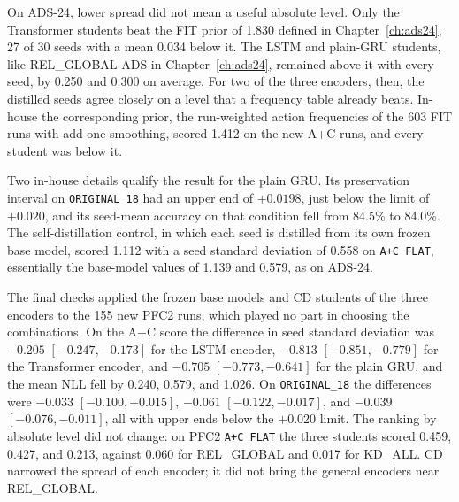 On ADS-24, lower spread did not mean a useful absolute level. Only the
Transformer students beat the FIT prior of 1.830 defined in
Chapter~\ref{ch:ads24}, 27 of 30 seeds with a mean 0.034 below it. The
LSTM and plain-GRU students, like REL\_GLOBAL-ADS in
Chapter~\ref{ch:ads24}, remained above it with every seed, by 0.250 and
0.300 on average. For two of the three encoders, then, the distilled seeds agree
closely on a level that a frequency table already beats. In-house the
corresponding prior, the run-weighted action frequencies of the 603 FIT
runs with add-one smoothing, scored 1.412 on the new A+C runs, and
every student was below it.

Two in-house details qualify the result for the plain GRU. Its
preservation interval on \texttt{ORIGINAL\_18} had an upper end of
$+0.0198$, just below the limit of $+0.020$, and its seed-mean accuracy
on that condition fell from 84.5\% to 84.0\%. The self-distillation control, in which each seed is distilled from
its own frozen base model, scored 1.112 with a seed standard deviation
of 0.558 on \texttt{A+C FLAT}, essentially the base-model values of
1.139 and 0.579, as on ADS-24.

The final checks applied the frozen base models and CD students of the
three encoders to the 155 new PFC2 runs, which played no part in
choosing the combinations. On the A+C score the
difference in seed standard deviation was $-0.205$ $[-0.247, -0.173]$
for the LSTM encoder, $-0.813$ $[-0.851, -0.779]$ for the Transformer
encoder, and $-0.705$ $[-0.773, -0.641]$ for the plain GRU, and the
mean NLL fell by 0.240, 0.579, and 1.026. On \texttt{ORIGINAL\_18} the
differences were $-0.033$ $[-0.100, +0.015]$, $-0.061$
$[-0.122, -0.017]$, and $-0.039$ $[-0.076, -0.011]$, all with upper
ends below the $+0.020$ limit. The ranking by absolute level did not
change: on PFC2 \texttt{A+C FLAT} the three students scored 0.459,
0.427, and 0.213, against 0.060 for REL\_GLOBAL and 0.017 for KD\_ALL.
CD narrowed the spread of each encoder; it did not bring the general
encoders near REL\_GLOBAL.

